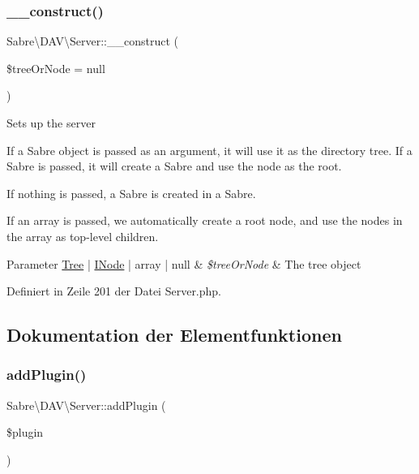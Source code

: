 \subsubsection{\texorpdfstring{\+\_\+\+\_\+construct()}{\_\_construct()}}
{\footnotesize\ttfamily Sabre\textbackslash{}\+D\+A\+V\textbackslash{}\+Server\+::\+\_\+\+\_\+construct (\begin{DoxyParamCaption}\item[{}]{\$tree\+Or\+Node = {\ttfamily null} }\end{DoxyParamCaption})}

Sets up the server

If a Sabre object is passed as an argument, it will use it as the directory tree. If a Sabre is passed, it will create a Sabre and use the node as the root.

If nothing is passed, a Sabre is created in a Sabre.

If an array is passed, we automatically create a root node, and use the nodes in the array as top-\/level children.


\begin{DoxyParams}[1]{Parameter}
\mbox{\hyperlink{class_sabre_1_1_d_a_v_1_1_tree}{Tree}} | \mbox{\hyperlink{interface_sabre_1_1_d_a_v_1_1_i_node}{I\+Node}} | array | null & {\em \$tree\+Or\+Node} & The tree object \\
\hline
\end{DoxyParams}


Definiert in Zeile 201 der Datei Server.\+php.



\subsection{Dokumentation der Elementfunktionen}
\mbox{\label{class_sabre_1_1_d_a_v_1_1_server_ae03f81b98c33c95202ec57a6f499ebf4}} 
\subsubsection{\texorpdfstring{add\+Plugin()}{addPlugin()}}
{\footnotesize\ttfamily Sabre\textbackslash{}\+D\+A\+V\textbackslash{}\+Server\+::add\+Plugin (\begin{DoxyParamCaption}\item[{\mbox{\hyperlink{class_sabre_1_1_d_a_v_1_1_server_plugin}{Server\+Plugin}}}]{\$plugin }\end{DoxyParamCaption})}

